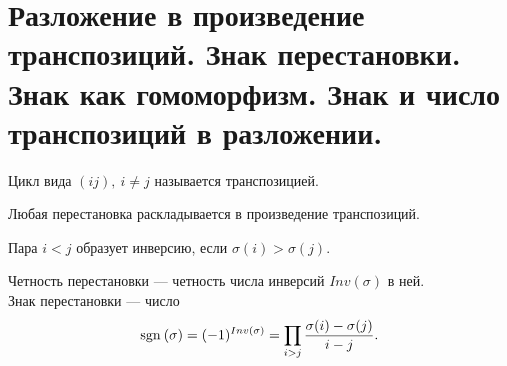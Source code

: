 \documentclass[11pt,dvipsnames]{report}
\begin{document}
\section{Разложение в произведение транспозиций. Знак перестановки. Знак как гомоморфизм. Знак и число транспозиций в разложении.}
\begin{defn}[Транспозиция]
    Цикл вида $ (ij), ~ i \ne j$ называется {\sf транспозицией}.  
\end{defn}
\begin{st}
    Любая перестановка раскладывается в произведение транспозиций.
\end{st}
\begin{defn}[Инверсия]
    Пара $ i < j$ образует  {\sf инверсию}, если $ \sigma (i) > \sigma (j)$.  
\end{defn}
\begin{defn}
    {\sf Четность перестановки} --- четность числа инверсий $ Inv(\sigma)$ в ней.  
    \\
    {\sf Знак перестановки} --- число
    \[
	{\mathop{\text{\rm sgn}}}\:( \sigma ) = (-1)^{Inv( \sigma )} = \prod_{i>j} \frac{ \sigma (i) - \sigma (j)}{i - j}
    .\] 
\end{defn}
\end{document}
